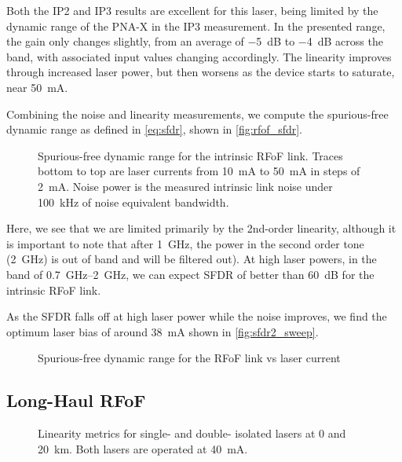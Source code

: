 Both the IP2 and IP3 results are excellent for this laser, being limited by the dynamic range of the PNA-X in the IP3 measurement.
In the presented range, the gain only changes slightly, from an average of \qty{-5}{\dB} to \qty{-4}{\dB} across the band, with associated input values changing accordingly.
The linearity improves through increased laser power, but then worsens as the device starts to saturate, near \qty{50}{\mA}.

Combining the noise and linearity measurements, we compute the spurious-free dynamic range as defined in \autoref{eq:sfdr}, shown in \autoref{fig:rfof_sfdr}.
%
\begin{figure}[ht!]%
    \centering
    \subfloat{}%
    \quad%
    \subfloat{}%
    \caption[Spurious-free dynamic range for the intrinsic RFoF link]{Spurious-free dynamic range for the intrinsic RFoF link. Traces bottom to top are laser currents from \qty{10}{\mA} to \qty{50}{\mA} in steps of \qty{2}{\mA}. Noise power is the measured intrinsic link noise under \qty{100}{\kHz} of noise equivalent bandwidth.}%
    \label{fig:rfof_sfdr}%
\end{figure}
%
Here, we see that we are limited primarily by the 2nd-order linearity, although it is important to note that after \qty{1}{\GHz}, the power in the second order tone (\qty{2}{\GHz}) is out of band and will be filtered out).
At high laser powers, in the band of \SIrange{0.7}{2}{\GHz}, we can expect SFDR of better than \qty{60}{\dB} for the intrinsic RFoF link.

As the SFDR falls off at high laser power while the noise improves, we find the optimum laser bias of around \qty{38}{\mA} shown in \autoref{fig:sfdr2_sweep}.

\begin{figure}[ht!]
    \centering
    
    \caption{Spurious-free dynamic range for the RFoF link vs laser current}
    \label{fig:sfdr2_sweep}
\end{figure}

\subsection{Long-Haul RFoF}

\begin{figure}[ht!]
    \centering
    
    \caption[Linearity metrics for single- and double- isolated lasers]{Linearity metrics for single- and double- isolated lasers at 0 and \qty{20}{\km}. Both lasers are operated at \qty{40}{mA}.}
    \label{fig:scattering_linearity}
\end{figure}

